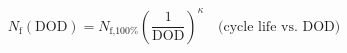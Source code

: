 \documentclass[preview]{standalone}
\begin{document}
\[N_\text{f}(\text{DOD}) = N_\text{f,100\%} \left(\frac{1}{\text{DOD}}\right)^{\!\kappa} \quad \text{(cycle life vs.\ DOD)} \tag{7.16}\]
\end{document}
